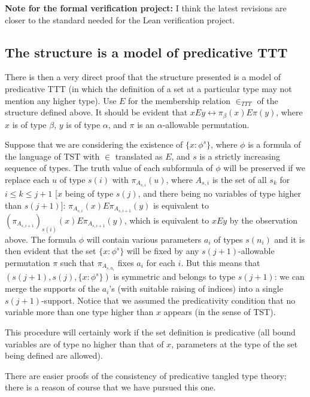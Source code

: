 \documentclass[112pt]{article}
\begin{document}
{\bf Note for the formal verification project:}  I think the latest revisions are closer to the standard needed for the Lean verification project.
\newpage
\subsection{The structure is a model of predicative TTT}

There is then a very direct proof that the structure presented is a model of predicative TTT (in which the definition of a set at a particular type may not mention any higher type).  Use $E$ for the membership relation $\in_{TTT}$ of the structure defined above.  It should be evident that $x E y \leftrightarrow \pi_\beta(x) E \pi(y)$,
where $x$ is of type $\beta$, $y$ is of type $\alpha$, and $\pi$ is an $\alpha$-allowable permutation.

Suppose that we are considering the existence of $\{x : \phi^s\}$, where $\phi$ is a formula of the language of TST with $\in$ translated as $E$, and $s$ is a strictly increasing sequence of types.  The truth value of each subformula of $\phi$ will be preserved if we replace each $u$ of type $s(i)$ with $\pi_{A_{s,i}}(u)$, where  $A_{s,i}$ is the set of all $s_k$ for $i \leq k \leq j+1$ [$x$ being of type $s(j)$, and there being no variables of type higher than $s(j+1)$]:  $\pi_{A_{s,i}}(x) E  \pi_{A_{s,i+1}}(y)$ is equivalent to $(\pi_{A_{s,i+1}})_{s(i)}(x) E \pi_{A_{s,i+1}}(y)$, which is equivalent to $xEy$ by the observation above. The formula $\phi$ will contain various parameters $a_i$ of types $s(n_i)$ and it is then evident that the set $\{x : \phi^s\}$ will be fixed by any $s(j+1)$-allowable permutation $\pi$ such that $\pi_{A_{s,n_i}}$ fixes $a_i$ for each $i$.  But this means that
$(s(j+1),s(j),\{x : \phi^s\})$ is symmetric and belongs to type $s(j+1)$:  we can merge the supports of the $a_i$'s (with suitable raising of indices) into a single $s(j+1)$-support.  Notice that we assumed the predicativity condition that no variable more than one type higher than $x$ appears (in the sense of TST).

This procedure will certainly work if the set definition is predicative (all bound variables are of type no higher than that of $x$, parameters at the type
of the set being defined are allowed).

There are easier proofs of the consistency of predicative tangled type theory;  there is a reason of course that we have pursued this one.
\end{document}
